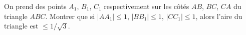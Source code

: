 On prend des points $A_1$, $B_1$, $C_1$ respectivement sur les côtés $AB$, $BC$, $CA$ du triangle $ABC$. Montrer que si $|AA_1| \leq 1$, $|BB_1| \leq 1$, $|CC_1| \leq 1$, alors l'aire du triangle est $\leq 1/\sqrt{3}$.
